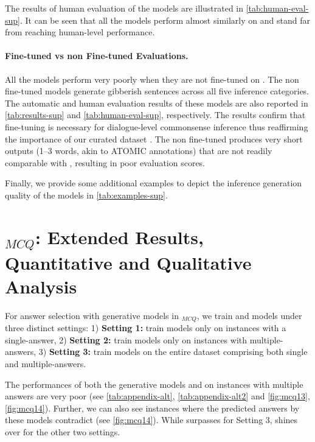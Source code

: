 The results of human evaluation of the models are illustrated in \cref{tab:human-eval-sup}. It can be seen that all the models perform almost similarly on \dataset{} and stand far from reaching human-level performance.

\paragraph{Fine-tuned vs non Fine-tuned Evaluations.}
All the models perform very poorly when they are not fine-tuned on \dataset{}.
The non fine-tuned models generate gibberish sentences across all five inference categories. The automatic and human evaluation results of these models are also reported in \cref{tab:results-sup} and \cref{tab:human-eval-sup}, respectively. 
The results confirm that fine-tuning is necessary for dialogue-level commonsense inference thus reaffirming the importance of our curated dataset \dataset{}. The non fine-tuned  produces very short outputs (1--3 words, akin to ATOMIC annotations) that are not readily comparable with \dataset{}, resulting in poor evaluation scores.

Finally, we provide some additional examples to depict the inference generation quality of the models in \cref{tab:examples-sup}.

\section{\dataset{}$_{MCQ}$: Extended Results, Quantitative and Qualitative Analysis}
\label{sec:appendix-alt}
For answer selection with generative models in \dataset{}$_{MCQ}$, we train  and  models under three distinct settings: 1) \textbf{Setting 1:} train models only on instances with a single-answer, 2) \textbf{Setting 2:} train models only on instances with multiple-answers, 3) \textbf{Setting 3:} train models on the entire dataset comprising both single and multiple-answers. 

The performances of both the generative models  and  on instances with multiple answers are very poor (see \cref{tab:appendix-alt}, \cref{tab:appendix-alt2} and \cref{fig:mcq13}, \cref{fig:mcq14}). Further, we can also see instances where the predicted answers by these models contradict (see \cref{fig:mcq14}). While  surpasses  for Setting 3,  shines over  for the other two settings. 

